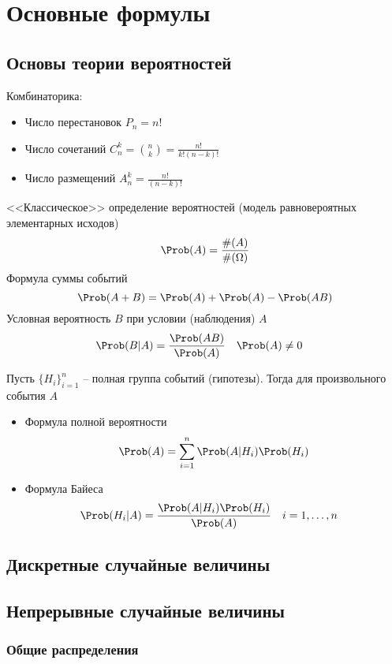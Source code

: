 
\section{Основные формулы}

\subsection{Основы теории вероятностей}

Комбинаторика:
\begin{itemize}
	\item Число перестановок \(P_n=n!\)
	\item Число сочетаний \(C_n^k=\binom{n}{k}=\frac{n!}{k!(n-k)!}\)
	\item Число размещений \(A_n^k=\frac{n!}{(n-k)!}\)
\end{itemize}
<<Классическое>> определение вероятностей (модель равновероятных элементарных исходов)
\[
	\Prob(A)=\frac{\#(A)}{\#(\Omega)}
\]
Формула суммы событий
\[
	\Prob(A+B)=\Prob(A)+\Prob(A)-\Prob(AB)
\]
Условная вероятность \(B\) при условии (наблюдения) \(A\)
\begin{align*}
	\Prob(B|A)&=\frac{\Prob(AB)}{\Prob(A)} & \Prob(A)&\ne0
\end{align*}

Пусть \(\{H_i\}_{i=1}^n\) -- полная группа событий (гипотезы).
Тогда для произвольного события  \(A\)
\begin{itemize}
	\item Формула полной вероятности
	\[
		\Prob(A)=\sum_{i=1}^n \Prob(A|H_i)\Prob(H_i)
	\]
	\item Формула Байеса
	\begin{align*}
		\Prob(H_i|A)&=\frac{\Prob(A|H_i)\Prob(H_i)}{\Prob(A)} &
		i&=1,\ldots,n
	\end{align*}
\end{itemize}

\subsection{Дискретные случайные величины}

\subsection{Непрерывные случайные величины}

\subsubsection{Общие распределения}

